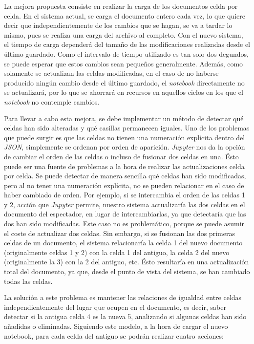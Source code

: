 \documentclass[11pt,spanish,listoffigures,listoftables]{tfgetsinf}
\begin{document}
La mejora propuesta consiste en realizar la carga de los documentos celda por celda. En el sistema actual, se carga el documento entero cada vez, lo que quiere decir que independientemente de los cambios que se hagan, se va a tardar lo mismo, pues se realiza una carga del archivo al completo. Con el nuevo sistema, el tiempo de carga dependerá del tamaño de las modificaciones realizadas desde el último guardado. Como el intervalo de tiempo utilizado es tan solo dos degundos, se puede esperar que estos cambios sean pequeños generalmente. Además, como solamente se actualizan las celdas modificadas, en el caso de no haberse producido ningún cambio desde el último guardado, el \textit{notebook} directamente no se actualizará, por lo que se ahorrará en recursos en aquellos  ciclos en los que el \textit{notebook} no contemple cambios.

Para llevar a cabo esta mejora, se debe implementar un método de detectar qué celdas han sido alteradas y qué casillas permanecen iguales. Uno de los problemas que puede surgir es que las celdas no tienen una numeración explícita dentro del \textit{JSON}, simplemente se ordenan por orden de aparición. \textit{Jupyter} nos da la opción de cambiar el orden de las celdas o incluso de fusionar dos celdas en una. Ésto puede ser una fuente de problemas a la hora de realizar las actualizaciones celda por celda. Se puede detectar de manera sencilla qué celdas han sido modificadas, pero al no tener una numeración explícita, no se pueden relacionar en el caso de haber cambiado de orden. Por ejemplo, si se intercambia el orden de las celdas 1 y 2, acción que \textit{Jupyter} permite, nuestro sistema actualizaría las dos celdas en el documento del espectador, en lugar de intercambiarlas, ya que detectaría que las dos han sido modificadas. Este caso no es problemático, porque se puede asumir el coste de actualizar dos celdas. Sin embargo, si se fusionan las dos primeras celdas de un documento, el sistema relacionaría la celda 1 del nuevo documento (originalmente celdas 1 y 2) con la celda 1 del antiguo, la celda 2 del nuevo (originalmente la 3) con la 2 del antiguo, etc. Ésto resultaría en una actualización total del documento, ya que, desde el punto de vista del sistema, se han cambiado todas las celdas. 

La solución a este problema es mantener las relaciones de igualdad entre celdas independientemente del lugar que ocupen en el documento, es decir, saber detectar si la antigua celda 4 es la nueva 5, analizando si algunas celdas han sido añadidas o eliminadas. Siguiendo este modelo, a la hora de cargar el nuevo notebook, para cada celda del antiguo se podrán realizar cuatro acciones:
\end{document}
